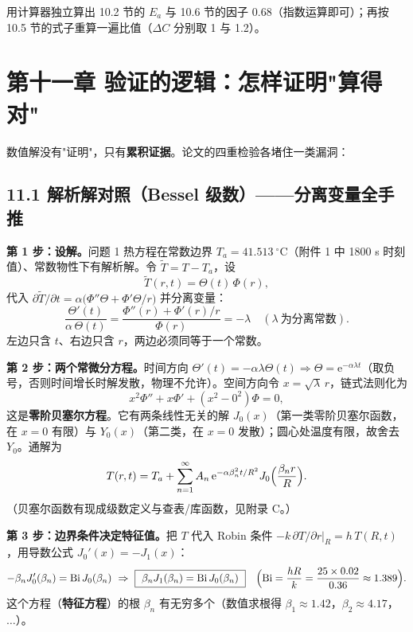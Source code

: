 \documentclass[12pt,a4paper]{ctexart}
\newcommand{\handon}[1]{\par\smallskip\noindent{\heiti 【手推练习】}#1\par\smallskip}
\begin{document}
\handon{用计算器独立算出 10.2 节的 $E_a$ 与 10.6 节的因子 0.68（指数运算即可）；再按 10.5 节的式子重算一遍比值（$\Delta C$ 分别取 1 与 1.2）。}

\section{第十一章 验证的逻辑：怎样证明"算得对"}

数值解没有"证明"，只有\textbf{累积证据}。论文的四重检验各堵住一类漏洞：

\subsection{11.1 解析解对照（Bessel 级数）——分离变量全手推}

\textbf{第 1 步：设解。}问题 1 热方程在常数边界 $T_a=41.513\ ^\circ$C（附件 1 中 1800 s 时刻值）、常数物性下有解析解。令 $\tilde T=T-T_a$，设
\begin{equation}
\tilde T(r,t)=\Theta(t)\,\Phi(r),
\end{equation}
代入 $\partial\tilde T/\partial t=\alpha\bigl(\Phi''\Theta+\Phi'\Theta/r\bigr)$ 并分离变量：
\begin{equation}
\frac{\Theta'(t)}{\alpha\,\Theta(t)}
=\frac{\Phi''(r)+\Phi'(r)/r}{\Phi(r)}=-\lambda
\quad(\lambda\ \text{为分离常数}).
\end{equation}
左边只含 $t$、右边只含 $r$，两边必须同等于一个常数。

\textbf{第 2 步：两个常微分方程。}时间方向 $\Theta'(t)=-\alpha\lambda\Theta(t)\Rightarrow\Theta=\mathrm{e}^{-\alpha\lambda t}$（取负号，否则时间增长时解发散，物理不允许）。空间方向令 $x=\sqrt{\lambda}\,r$，链式法则化为
\begin{equation}
x^2\Phi''+x\Phi'+(x^2-0^2)\Phi=0,
\end{equation}
这是\textbf{零阶贝塞尔方程}。它有两条线性无关的解 $J_0(x)$（第一类零阶贝塞尔函数，在 $x=0$ 有限）与 $Y_0(x)$（第二类，在 $x=0$ 发散）；圆心处温度有限，故舍去 $Y_0$。通解为
\begin{equation}
T(r,t)=T_a+\sum_{n=1}^{\infty}A_n\,\mathrm{e}^{-\alpha\beta_n^2t/R^2}J_0\Bigl(\frac{\beta_n r}{R}\Bigr).
\end{equation}
（贝塞尔函数有现成级数定义与查表/库函数，见附录 C。）

\textbf{第 3 步：边界条件决定特征值。}把 $T$ 代入 Robin 条件 $-k\,\partial T/\partial r|_R=h\,T(R,t)$，用导数公式 $J_0'(x)=-J_1(x)$：
\begin{equation}
-\beta_n J_0'(\beta_n)=\mathrm{Bi}\,J_0(\beta_n)
\ \Rightarrow\ \boxed{\ \beta_nJ_1(\beta_n)=\mathrm{Bi}\,J_0(\beta_n)\ }
\quad\Bigl(\mathrm{Bi}=\frac{hR}{k}=\frac{25\times0.02}{0.36}\approx1.389\Bigr).
\end{equation}
这个方程（\textbf{特征方程}）的根 $\beta_n$ 有无穷多个（数值求根得 $\beta_1\approx1.42$，$\beta_2\approx4.17$，$\dots$）。
\end{document}
